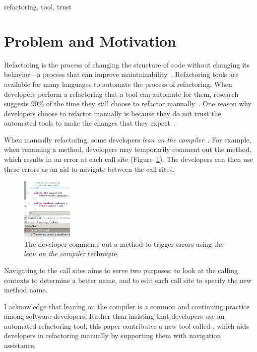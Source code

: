 \documentclass{sigplanconf}
\begin{document}
\keywords
refactoring, tool, trust


\section{Problem and Motivation}
Refactoring is the process of changing the structure of code without changing
its behavior---a process that can improve
maintainability~\cite{maintainability}.
Refactoring tools are available for many languages to automate the process of
refactoring. When developers perform a refactoring that a tool can automate for
them, research suggests 90\% of the time they still choose to refactor
manually~\cite{how-refactor}. One reason why developers choose to refactor
manually is because they do not trust the automated tools to make the changes
that they expect~\cite{how-refactor, say-refactor}. 

When manually refactoring, some developers
\textit{lean on the compiler}~\cite{legacy-code, how-refactor}.
For example, when renaming a method, developers may temporarily comment
out the method, which results
in an error at each call site (Figure~\ref{comment}). The developers can then
use these errors as an aid to navigate between the call sites.
\begin{figure}[h]
\begin{center}
\includegraphics[width=0.22\textwidth]{comment.png}
\caption{The developer comments out a method to trigger errors using the
\textit{lean on the compiler} technique.\label{comment}}
\end{center}
\end{figure}
Navigating to the call sites aims to serve two purposes: to look at the calling
contexts to determine a better name, and to edit each call site to specify
the new method name.

I acknowledge that leaning on the compiler is a common and continuing practice
among software developers. Rather than insisting that developers use an
automated refactoring tool, this paper contributes a new tool
called \pname{}, which aids developers in refactoring
manually by supporting them with navigation assistance.
\end{document}
